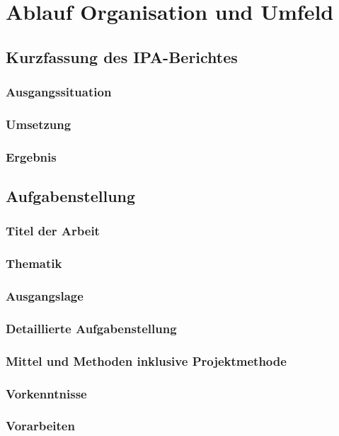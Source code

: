 \documentclass{report}
\begin{document}
\part{Ablauf Organisation und Umfeld}
\chapter{Kurzfassung des IPA-Berichtes}
\section{Ausgangssituation}
\section{Umsetzung}
\section{Ergebnis}

\tableofcontents



\chapter{Aufgabenstellung}
\section{Titel der Arbeit}
\section{Thematik}
\section{Ausgangslage}
\section{Detaillierte Aufgabenstellung}
\section{Mittel und Methoden inklusive Projektmethode}
\section{Vorkenntnisse}
\section{Vorarbeiten}
\end{document}
